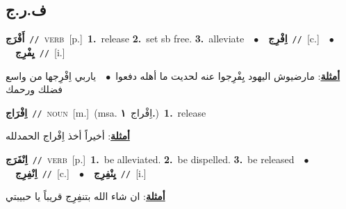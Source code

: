 \documentclass[10pt,a4paper,twoside]{article} %
\begin{document}
\begin{multicols}{2}
\vspace{-3mm}
\subsection*{\color{blue}\foreignlanguage{arabic}{ف.ر.ج}\color{blue}{}} 

{\setlength\topsep{0pt}\textbf{\foreignlanguage{arabic}{أَفْرَج}}\ {\color{gray}\texttt{//}\color{black}}\ \textsc{verb}\ [p.]\ \textbf{1.}~release  \textbf{2.}~set sb free.  \textbf{3.}~alleviate\ \ $\bullet$\ \ \setlength\topsep{0pt}\textbf{\foreignlanguage{arabic}{اِفْرِج}}\ {\color{gray}\texttt{//}\color{black}}\ [c.]\ \ $\bullet$\ \ \setlength\topsep{0pt}\textbf{\foreignlanguage{arabic}{يِفْرِج}}\ {\color{gray}\texttt{//}\color{black}}\ [i.]\  \begin{flushright}\color{gray}\foreignlanguage{arabic}{\textbf{\underline{\foreignlanguage{arabic}{أمثلة}}}: مارضيوش اليهود يِفْرِجوا عنه لحديت ما أهله دفعوا\ $\bullet$\ \  ياربي اِفْرِجها من واسع فضلك ورحمك}\end{flushright}\color{black}} \vspace{2mm}

{\setlength\topsep{0pt}\textbf{\foreignlanguage{arabic}{اِفْرَاج}}\ {\color{gray}\texttt{//}\color{black}}\ \textsc{noun}\ [m.]\ \color{gray}(msa. \foreignlanguage{arabic}{اِفْراج}~\foreignlanguage{arabic}{\textbf{١.}})\color{black}\ \textbf{1.}~release\  \begin{flushright}\color{gray}\foreignlanguage{arabic}{\textbf{\underline{\foreignlanguage{arabic}{أمثلة}}}: أخيراً أخذ اِفْراج الحمدلله}\end{flushright}\color{black}} \vspace{2mm}

{\setlength\topsep{0pt}\textbf{\foreignlanguage{arabic}{اِنْفَرَج}}\ {\color{gray}\texttt{//}\color{black}}\ \textsc{verb}\ [p.]\ \textbf{1.}~be alleviated.  \textbf{2.}~be dispelled.  \textbf{3.}~be released\ \ $\bullet$\ \ \setlength\topsep{0pt}\textbf{\foreignlanguage{arabic}{اِنْفِرِج}}\ {\color{gray}\texttt{//}\color{black}}\ [c.]\ \ $\bullet$\ \ \setlength\topsep{0pt}\textbf{\foreignlanguage{arabic}{يِنْفِرِج}}\ {\color{gray}\texttt{//}\color{black}}\ [i.]\  \begin{flushright}\color{gray}\foreignlanguage{arabic}{\textbf{\underline{\foreignlanguage{arabic}{أمثلة}}}: ان شاء الله بتنفِرِج قريباً يا حبيبتي}\end{flushright}\color{black}} \vspace{2mm}


\end{multicols}
\end{document}
